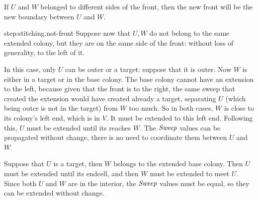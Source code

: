 \documentclass[11pt]{memoir}
\theoremstyle{definition} %
\renewcommand{\ge}{\geq}
\newcommand{\fld}[1]{\ensuremath{\textit{#1\/}}}
\newcommand{\Sweep}{\fld{Sweep}}
\begin{document}
\begin{Proof}
\begin{prooof}

If \( U  \) and \( W \) belonged to different sides of the front, then the
new front will be the new boundary between \( U \) and \( W \).
\end{prooof} %

\begin{step+}{step:stitching.not-front}
Suppose now that \( U,W \) do not belong to the same extended colony, but they are on 
the same side of the front: without loss of generality, to the left of it.
\end{step+}
\begin{prooof}
In this case, only \( U \) can be outer or a target: suppose that it is outer.
Now \( W \) is either in a target or in the base colony.
The base colony cannot have an extension to the left, because given that the front
is to the right, the same sweep that created the extension would have created already a target, 
separating \( U \) (which being outer is not in the target) from \( W \) too much.
So in both cases, \( W \) is close to its colony's left end, which is in \( V \).
It must be extended to this left end.
Following this, \( U \) must be extended until its reaches \( W \).
The \( \Sweep \) values can be propagated without change, there is no need to coordinate them
between \( U \) and \( W \).

Suppose that \( U \) is a target, then \( W \) belongs to the extended base colony.
Then \( U \) must be extended until its endcell, and then \( W \) must be extended to meet \( U \).
Since both \( U \) and \( W \) are in the interior, the \( \Sweep \) values must be equal, so they
can be extended without change.
\end{prooof} %


\end{Proof}
\end{document}
